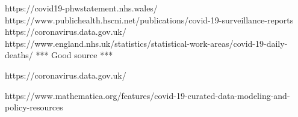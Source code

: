 
https://covid19-phwstatement.nhs.wales/
https://www.publichealth.hscni.net/publications/covid-19-surveillance-reports
https://coronavirus.data.gov.uk/
https://www.england.nhs.uk/statistics/statistical-work-areas/covid-19-daily-deaths/ *** Good source ***

https://coronavirus.data.gov.uk/


https://www.mathematica.org/features/covid-19-curated-data-modeling-and-policy-resources